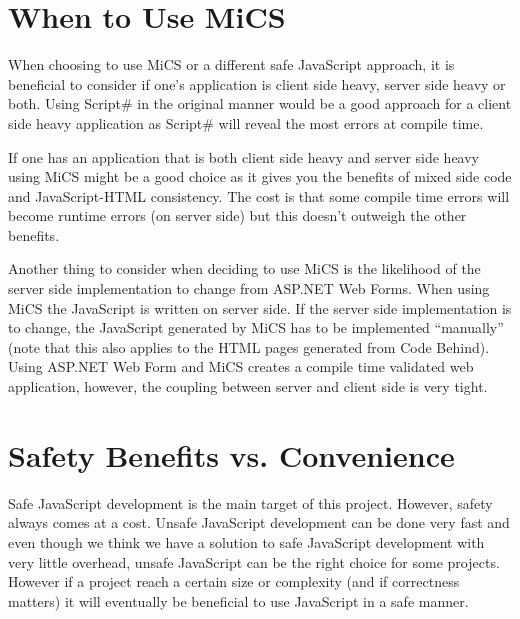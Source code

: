 
\section{When to Use MiCS} %
\label{sec:when_to_use_mics}
	When choosing to use MiCS or a different safe JavaScript approach, it is beneficial to consider if one's application is client side heavy, server side heavy or both. Using Script\# in the original manner would be a good approach for a client side heavy application as Script\# will reveal the most errors at compile time. 

	If one has an application that is both client side heavy and server side heavy using MiCS might be a good choice as it gives you the benefits of mixed side code and JavaScript-HTML consistency. The cost is that some compile time errors will become runtime errors (on server side) but this doesn't outweigh the other benefits. 

	Another thing to consider when deciding to use MiCS is the likelihood of the server side implementation to change from ASP.NET Web Forms. When using MiCS the JavaScript is written on server side. If the server side implementation is to change, the JavaScript generated by MiCS has to be implemented ``manually'' (note that this also applies to the HTML pages generated from Code Behind). Using ASP.NET Web Form and MiCS creates a compile time validated web application, however, the coupling between server and client side is very tight.



\section{Safety Benefits vs. Convenience} %
\label{sec:safety_benefits_vs_conveniente}
	Safe JavaScript development is the main target of this project. However, safety always comes at a cost. Unsafe JavaScript development can be done very fast and even though we think we have a solution to safe JavaScript development with very little overhead, unsafe JavaScript can be the right choice for some projects. However if a project reach a certain size or complexity (and if correctness matters) it will eventually be beneficial to use JavaScript in a safe manner.


